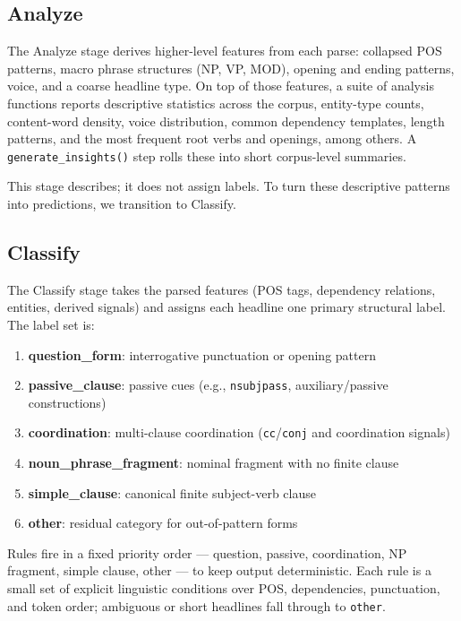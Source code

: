 \documentclass[11pt]{article}
\begin{document}
\subsection{Analyze}
The Analyze stage derives higher-level features from each parse: collapsed POS patterns, macro phrase structures (NP, VP, MOD), opening and ending patterns, voice, and a coarse headline type. On top of those features, a suite of analysis functions reports descriptive statistics across the corpus, entity-type counts, content-word density, voice distribution, common dependency templates, length patterns, and the most frequent root verbs and openings, among others. A \texttt{generate\_insights()} step rolls these into short corpus-level summaries.

This stage describes; it does not assign labels. To turn these descriptive patterns into predictions, we transition to Classify.

\subsection{Classify}
\label{sec:classify}
The Classify stage takes the parsed features (POS tags, dependency relations, entities, derived signals) and assigns each headline one primary structural label. The label set is:

\begin{enumerate}
    \item \textbf{question\_form}: interrogative punctuation or opening pattern
    \item \textbf{passive\_clause}: passive cues (e.g., \texttt{nsubjpass}, auxiliary/passive constructions)
    \item \textbf{coordination}: multi-clause coordination (\texttt{cc}/\texttt{conj} and coordination signals)
    \item \textbf{noun\_phrase\_fragment}: nominal fragment with no finite clause
    \item \textbf{simple\_clause}: canonical finite subject-verb clause
    \item \textbf{other}: residual category for out-of-pattern forms
\end{enumerate}

Rules fire in a fixed priority order --- question, passive, coordination, NP fragment, simple clause, other --- to keep output deterministic. Each rule is a small set of explicit linguistic conditions over POS, dependencies, punctuation, and token order; ambiguous or short headlines fall through to \texttt{other}.
\end{document}
